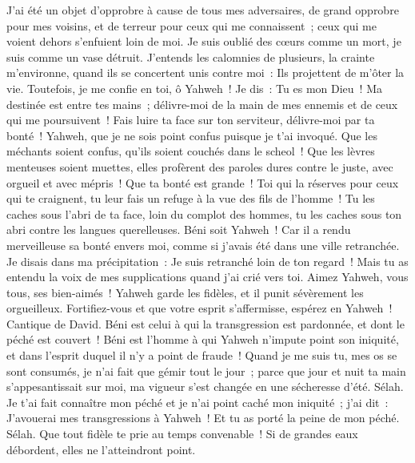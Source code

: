 \begin{multicols}{2}
J'ai été un objet d'opprobre à cause de tous mes adversaires, de grand opprobre pour mes voisins, et de terreur pour ceux qui me connaissent~; ceux qui me voient dehors s'enfuient loin de moi.
Je suis oublié des cœurs comme un mort, je suis comme un vase détruit.
J'entends les calomnies de plusieurs, la crainte m'environne, quand ils se concertent unis contre moi~: Ils projettent de m'ôter la vie.
Toutefois, je me confie en toi, ô Yahweh~! Je dis~: Tu es mon Dieu~!
Ma destinée est entre tes mains~; délivre-moi de la main de mes ennemis et de ceux qui me poursuivent~!
Fais luire ta face sur ton serviteur, délivre-moi par ta bonté~!
Yahweh, que je ne sois point confus puisque je t'ai invoqué. Que les méchants soient confus, qu'ils soient couchés dans le scheol~!
Que les lèvres menteuses soient muettes, elles profèrent des paroles dures contre le juste, avec orgueil et avec mépris~!
Que ta bonté est grande~! Toi qui la réserves pour ceux qui te craignent, tu leur fais un refuge à la vue des fils de l'homme~!
Tu les caches sous l'abri de ta face, loin du complot des hommes, tu les caches sous ton abri contre les langues querelleuses.
Béni soit Yahweh~! Car il a rendu merveilleuse sa bonté envers moi, comme si j'avais été dans une ville retranchée.
Je disais dans ma précipitation~: Je suis retranché loin de ton regard~! Mais tu as entendu la voix de mes supplications quand j'ai crié vers toi.
Aimez Yahweh, vous tous, ses bien-aimés~! Yahweh garde les fidèles, et il punit sévèrement les orgueilleux.
Fortifiez-vous et que votre esprit s'affermisse, espérez en Yahweh~!
\VerseOne{}Cantique de David. Béni est celui à qui la transgression est pardonnée, et dont le péché est couvert~!
Béni est l'homme à qui Yahweh n'impute point son iniquité, et dans l'esprit duquel il n'y a point de fraude~!
Quand je me suis tu, mes os se sont consumés, je n'ai fait que gémir tout le jour~;
parce que jour et nuit ta main s'appesantissait sur moi, ma vigueur s'est changée en une sécheresse d'été. Sélah.
Je t'ai fait connaître mon péché et je n'ai point caché mon iniquité~; j'ai dit~: J'avouerai mes transgressions à Yahweh~! Et tu as porté la peine de mon péché. Sélah.
Que tout fidèle te prie au temps convenable~! Si de grandes eaux débordent, elles ne l'atteindront point.

\end{multicols}
